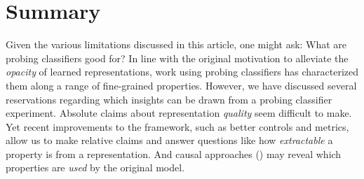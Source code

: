 \documentclass[discussion]{clv3}
\begin{document}
\section{Summary}


Given the various limitations discussed in this article, one might ask: 
What are probing classifiers good for? In line with the original motivation to alleviate the \emph{opacity} of learned representations, work using probing classifiers has characterized them along a range of fine-grained properties. 
However, we have discussed several reservations regarding which insights can be drawn from a probing classifier experiment. 
Absolute claims about representation \emph{quality} seem difficult to make. 
Yet recent improvements to the framework, such as better controls and metrics, allow us to make relative claims and answer questions like how \emph{extractable} a property is from a representation.  
And causal approaches () may reveal which properties are \emph{used} by the original model. 
\end{document}
